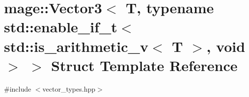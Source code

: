 \hypertarget{structmage_1_1_vector3_3_01_t_00_01typename_01std_1_1enable__if__t_3_01std_1_1is__arithmetic__v_3_01_t_01_4_00_01void_01_4_01_4}{}\section{mage\+:\+:Vector3$<$ T, typename std\+:\+:enable\+\_\+if\+\_\+t$<$ std\+:\+:is\+\_\+arithmetic\+\_\+v$<$ T $>$, void $>$ $>$ Struct Template Reference}
\label{structmage_1_1_vector3_3_01_t_00_01typename_01std_1_1enable__if__t_3_01std_1_1is__arithmetic__v_3_01_t_01_4_00_01void_01_4_01_4}


{\ttfamily \#include $<$vector\+\_\+types.\+hpp$>$}

